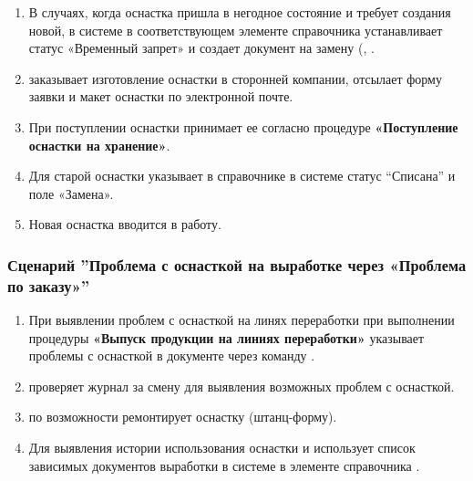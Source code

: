 \begin{enumerate}
\item	В случаях, когда оснастка пришла в негодное состояние и требует создания новой, \preproductionspecialist в системе \gofro в соответствующем элементе справочника  устанавливает статус «Временный запрет» и создает документ на замену (,  .
\item	\constructor заказывает изготовление оснастки в сторонней компании, отсылает форму заявки и макет оснастки по электронной почте.
\item	При поступлении оснастки \preproductionspecialist принимает ее согласно процедуре \textbf{«Поступление оснастки на хранение»}.
\item	Для старой оснастки \preproductionspecialist указывает в справочнике  в системе \gofro статус “Списана” и поле «Замена».
\item	Новая оснастка вводится в работу. %






\end{enumerate}



\subsubsection{Сценарий ''Проблема с оснасткой на выработке через «Проблема по заказу»''}
\label{bp:tool_4}

\begin{enumerate}
\item	При выявлении проблем с оснасткой на линях переработки при выполнении процедуры \textbf{«Выпуск продукции на линиях переработки»} \operator указывает проблемы с оснасткой в документе  через команду .
\item	\preproductionspecialist проверяет журнал  за смену для выявления возможных проблем с оснасткой.

\item \operator по возможности ремонтирует оснастку (штанц-форму). 
\item	Для выявления истории использования оснастки \constructor и \preproductionspecialist использует список зависимых  документов выработки в системе \gofro в элементе  справочника .
\end{enumerate}